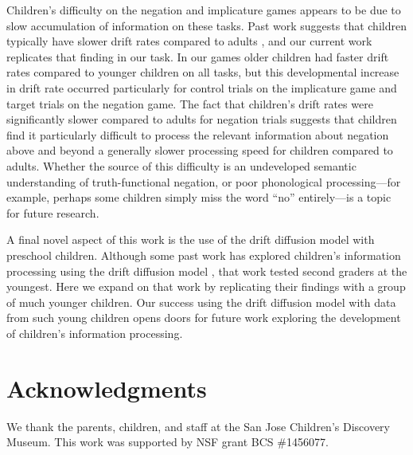 \documentclass[10pt,letterpaper]{article}
\begin{document}
Children's difficulty on the negation and implicature games appears to be due to slow accumulation of information on these tasks. Past work suggests that children typically have slower drift rates compared to adults \cite{ratcliff2012}, and our current work replicates that finding in our task. In our games older children had faster drift rates compared to younger children on all tasks, but this developmental increase in drift rate occurred particularly for control trials on the implicature game and target trials on the negation game. The fact that children's drift rates were significantly slower compared to adults for negation trials suggests that children find it particularly difficult to process the relevant information about negation above and beyond a generally slower processing speed for children compared to adults. Whether the source of this difficulty is an undeveloped semantic understanding of truth-functional negation, or poor phonological processing---for example, perhaps some children simply miss the word ``no'' entirely---is a topic for future research.

A final novel aspect of this work is the use of the drift diffusion model with preschool children. Although some past work has explored children's information processing using the drift diffusion model \cite{ratcliff2012}, that work tested second graders at the youngest. Here we expand on that work by replicating their findings with a group of much younger children. Our success using the drift diffusion model with data from such young children opens doors for future work exploring the development of children's information processing.

\section{Acknowledgments}
%
We thank the parents, children, and staff at the San Jose Children's Discovery Museum. This work was supported by NSF grant BCS \#1456077.




\setlength{\bibleftmargin}{.125in}
\setlength{\bibindent}{-\bibleftmargin}


\end{document}
